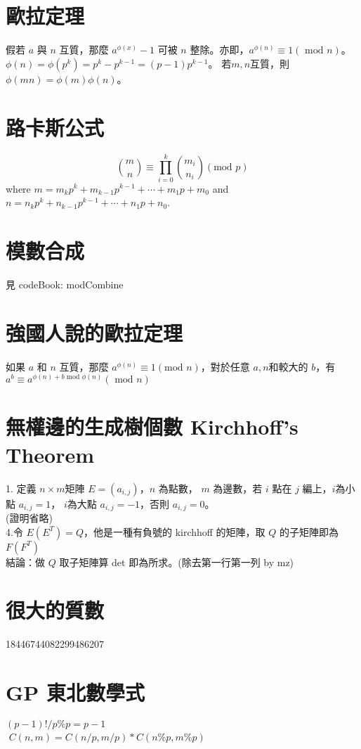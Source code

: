 \section{歐拉定理}
假若 $a$ 與 $n$ 互質，那麼 $a^{\phi(x)}-1$ 可被 $n$ 整除。亦即，$a^{\phi(n)}\equiv1(\mbox{ mod }n)$。
$\phi(n)=\phi(p^k)=p^k-p^{k-1}=(p-1)p^{k-1}$。
若$m,n$互質，則$\phi(mn)=\phi(m)\phi(n)$。

\section{路卡斯公式}
\[{m\choose n}\equiv\prod_{i=0}^k{m_i \choose n_i}(\mbox{mod }p)\] where $m=m_kp^k+m_{k-1}p^{k-1}+\cdots+m_1p+m_0$ and 
$n=n_kp^k+n_{k-1}p^{k-1}+\cdots+n_1p+n_0$.

\section{模數合成}
見 codeBook: modCombine

\section{強國人說的歐拉定理}
如果 $a$ 和 $n$ 互質，那麼 $a^{\phi(n)}\equiv1(\mbox{mod }n)$，對於任意 $a,n$和較大的 $b$，有 $a^b\equiv a^{\phi(n)+b\mbox{ mod }\phi(n)}(\mbox{ mod }n)$

\section{無權邊的生成樹個數 Kirchhoff's Theorem}
1. 定義 $n\times m$矩陣 $E=(a_{i,j})$，$n$ 為點數， $m$ 為邊數，若 $i$ 點在 $j$ 編上，$i$為小點 $a_{i,j}=1$， $i$為大點 $a_{i,j}=-1$，否則 $a_{i,j}=0$。\\
(證明省略)
\\
4.令 $E(E^T)=Q$，他是一種有負號的 kirchhoff 的矩陣，取 $Q$ 的子矩陣即為 $F(F^T)$\\
結論：做 $Q$ 取子矩陣算 det 即為所求。(除去第一行第一列 by mz)

\section{很大的質數}
18446744082299486207

\section{GP 東北數學式}
$(p-1)!/p \%p = p-1$\\ $C(n,m) = C(n/p,m/p) * C(n\%p,m\%p)$

